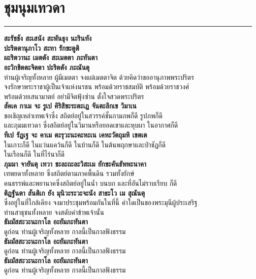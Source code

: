 \documentclass[12pt]{article}
\begin{document}
\pagebreak

\section{ชุมนุมเทวดา}
\hrule
\textbf{สะรัชชัง สะเสนัง สะพันธุง นะรินทัง\\
ปะริตตานุภาโว สะทา รักขะตูติ\\
ผะริตวานะ เมตตัง สะเมตตา ภะทันตา\\
อะวิกขิตตะจิตตา ปะริตตัง ภะณันตุ}\\
\indent ท่านผู้เจริญทั้งหลาย ผู้มีเมตตา จงแผ่เมตตาจิต ด้วยคิดว่าขออานุภาพพระปริตร\\
\indent จงรักษาพระราชาผู้เป็นเจ้าแห่งนรชน พร้อมด้วยราชสมบัติ พร้อมด้วยราชวงศ์ \\
\indent พร้อมด้วยเสนามาตย์ อย่ามีจิตฟุ้งซ่าน ตั้งใจสวดพระปริตร\\
\textbf{สัคเค กาเม จะ รูเป คิริสิขะระตะเฏ จันตะลิกเข วิมาเน}\\
\indent ขอเชิญเหล่าเทพเจ้าซึ่ง สถิตย์อยู่ในสวรรค์ชั้นกามภพก็ดี รูปภพก็ดี \\
\indent และภุมมเทวดา ซึ่งสถิตย์อยู่ในวิมานหรือยอดเขาและหุบผา ในอากาศก็ดี\\
\textbf{ทีเป รัฏเฐ จะ คาเม ตะรุวะนะคะหะเน เคหะวัตถุมหิ เขตเต}\\
\indent ในเกาะก็ดี ในแว่นแคว้นก็ดี ในบ้านก็ดี ในต้นพฤกษาและป่าชัฏก็ดี\\
\indent ในเรือนก็ดี ในที่ไร่นาก็ดี\\
\textbf{ภุมมา จายันตุ เทวา ชะละถะละวิสะเม ยักขะคันธัพพะนาคา}\\
\indent เทพยดาทั้งหลาย ซึ่งสถิตย์ตามภาคพื้นดิน รวมทั้งยักษ์ \\
\indent คนธรรพ์และพยานาคซึ่งสถิตย์อยู่ในน้ำ บนบก และที่อันไม่ราบเรียบ ก็ดี\\
\textbf{ติฏฐันตา สันติเก ยัง มุนิวะระวะจะนัง สาธะโว เม สุณันตุ}\\
\indent ซึ่งอยู่ในที่ใกล้เคียง จงมาประชุมพร้อมกันในที่นี้ คำใดเป็นของพระมุนีผู้ประเสริฐ\\ 
\indent ท่านสาธุชนทั้งหลาย จงสดับคำข้าพเจ้านั้น\\
\textbf{ธัมมัสสะวะนะกาโล อะยัมภะทันตา}\\
\indent ดูก่อน ท่านผู้เจริญทั้งหลาย กาลนี้เป็นกาลฟังธรรม\\
\textbf{ธัมมัสสะวะนะกาโล อะยัมภะทันตา}\\
\indent ดูก่อน ท่านผู้เจริญทั้งหลาย กาลนี้เป็นกาลฟังธรรม\\
\textbf{ธัมมัสสะวะนะกาโล อะยัมภะทันตา}\\
\indent ดูก่อน ท่านผู้เจริญทั้งหลาย กาลนี้เป็นกาลฟังธรรม
\end{document}
